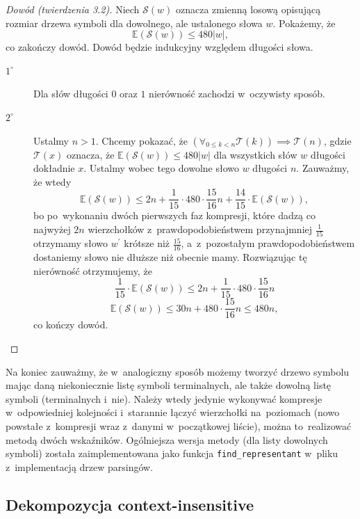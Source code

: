 \documentclass[declaration,shortabstract]{iithesis}
\theoremstyle{definition} \newtheorem{definition}{Definicja}[chapter]
\theoremstyle{remark} \newtheorem{remark}[definition]{Obserwacja}
\theoremstyle{plain} \newtheorem{theorem}[definition]{Twierdzenie}
\theoremstyle{remark} \newtheorem{example}{Przykład}[definition]
\theoremstyle{plain} \newtheorem{lemma}[definition]{Lemat}
\begin{document}
\begin{proof}[Dowód (twierdzenia 3.2)]
    Niech $\mathcal{S}(w)$ oznacza zmienną losową opisującą rozmiar drzewa symboli dla dowolnego, ale ustalonego słowa $w$. Pokażemy, że $$\mathbb{E} (\mathcal{S} (w)) \leq 480|w|,$$ co zakończy dowód. Dowód będzie indukcyjny względem długości słowa.
    \begin{description}
        \item[$1^\circ$] Dla słów długości $0$ oraz $1$ nierówność zachodzi w~oczywisty sposób.
        \item[$2^\circ$] Ustalmy $n > 1$. Chcemy pokazać, że $(\forall_{0 \leq k < n} \mathcal{T}(k)) \implies \mathcal{T}(n)$, gdzie $\mathcal{T}(x)$ oznacza, że $\mathbb{E} (\mathcal{S} (w)) \leq 480|w|$ dla wszystkich słów $w$ długości dokładnie $x$. Ustalmy wobec tego dowolne słowo $w$ długości $n$. Zauważmy, że wtedy $$\mathbb{E}(\mathcal{S}(w)) \leq 2n + \frac{1}{15} \cdot 480 \cdot \frac{15}{16}n + \frac{14}{15} \cdot \mathbb{E}(\mathcal{S}(w)),$$ bo po~wykonaniu dwóch pierwszych faz kompresji, które dadzą co najwyżej $2n$ wierzchołków z~prawdopodobieństwem przynajmniej $\frac{1}{15}$ otrzymamy słowo $w^\prime$ krótsze niż $\frac{15}{16}$, a~z~pozostałym prawdopodobieństwem dostaniemy słowo nie dłuższe niż obecnie mamy. Rozwiązując tę nierówność otrzymujemy, że $$\frac{1}{15} \cdot \mathbb{E}(\mathcal{S}(w)) \leq 2n + \frac{1}{15} \cdot 480 \cdot \frac{15}{16}n$$ $$\mathbb{E}(\mathcal{S}(w)) \leq 30n + 480 \cdot \frac{15}{16} n \leq 480n,$$ co kończy dowód.
    \end{description}
\end{proof}

Na koniec zauważmy, że w~analogiczny sposób możemy tworzyć drzewo symbolu mając daną niekoniecznie listę symboli terminalnych, ale także dowolną listę symboli (terminalnych i~nie). Należy wtedy jedynie wykonywać kompresje w~odpowiedniej kolejności i~starannie łączyć wierzchołki na~poziomach (nowo powstałe z~kompresji wraz z~danymi w~początkowej liście), można to~realizować metodą dwóch wskaźników. Ogólniejsza wersja metody (dla listy dowolnych symboli) została zaimplementowana jako funkcja \texttt{find\_representant} w~pliku z~implementacją drzew parsingów.

\subsection{Dekompozycja context-insensitive}
\end{document}
